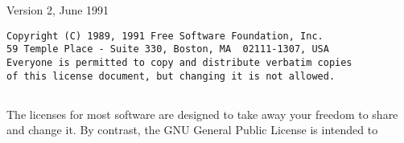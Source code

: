 Version 2, June 1991 

\footnotesize
\begin{verbatim}
Copyright (C) 1989, 1991 Free Software Foundation, Inc.
59 Temple Place - Suite 330, Boston, MA  02111-1307, USA
Everyone is permitted to copy and distribute verbatim copies
of this license document, but changing it is not allowed.
\end{verbatim}
\normalsize

\subsection*{
}
\label{SEC2}

The licenses for most software are designed to take away your freedom to share
and change it. By contrast, the GNU General Public License is intended to
